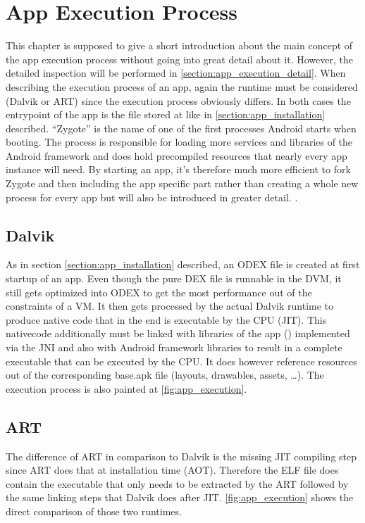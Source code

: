 \section{App Execution Process}\label{section:app_execution_simple}
This chapter is supposed to give a short introduction about the
main concept of the app execution process without going into
great detail about it. However, the detailed inspection will
be performed in \autoref{section:app_execution_detail}.
When describing the execution process of an app, again the
runtime must be considered (Dalvik or ART) since the execution process
obviously differs. In both cases the entrypoint of the app is the
file stored at  like in
\autoref{section:app_installation} described. ``Zygote'' is
the name of one of the first processes Android starts when booting.
The process is responsible for loading more services and libraries
of the Android framework and does hold precompiled resources that
nearly every app instance will need.
By starting an app, it's therefore much more efficient to fork
Zygote and then including the app specific part rather than
creating a whole new process for every app but will also be introduced
in greater detail.
\parencite[ch.2]{hackershandbook}.

\subsection{Dalvik}
As in section \autoref{section:app_installation} described, an
ODEX file is created at first startup of an app. Even though
the pure DEX file is runnable in the DVM, it still gets optimized
into ODEX to get the most performance out of the
constraints of a VM.
It then gets processed by the actual Dalvik runtime to produce
native code that in the end is executable by the CPU (JIT).
This nativecode additionally must be linked with libraries of the app
() implemented via the JNI
and also with Android framework libraries to result in a complete
executable that can be executed by the CPU. It does however
reference resources out of the corresponding base.apk file (layouts,
drawables, assets, \ldots). The execution process is also painted
at \autoref{fig:app_execution}.

\subsection{ART}
The difference of ART in comparison to Dalvik is the missing
JIT compiling step since ART does that at installation time
(AOT). Therefore the ELF file does contain the executable that
only needs to be extracted by the ART followed by the same
linking steps that Dalvik does after JIT. \autoref{fig:app_execution}
shows the direct comparison of those two runtimes.

